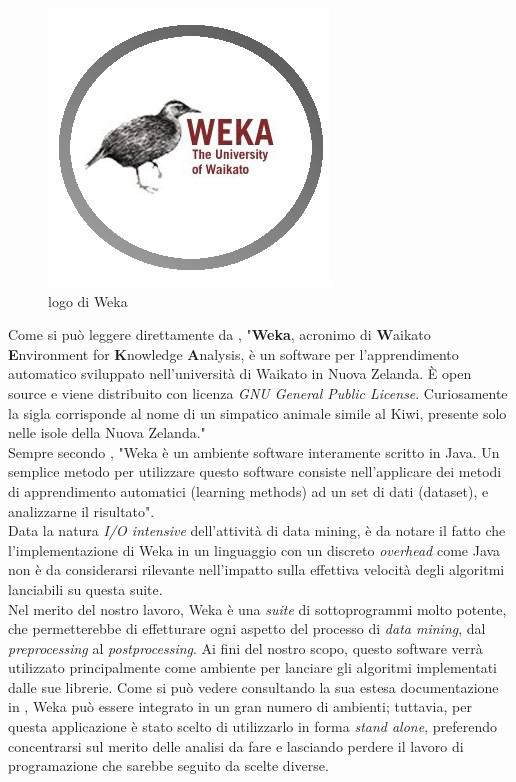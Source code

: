         \begin{figure}
            \centering
            \caption{logo di Weka}
            \label{weka}
    	    \includegraphics[scale=0.65]{img/weka.jpg}
        \end{figure}

    Come si può leggere direttamente da \cite{wekawiki}, "\textbf{Weka}, acronimo di \textbf{W}aikato \textbf{E}nvironment for \textbf{K}nowledge \textbf{A}nalysis, è un software per l'apprendimento automatico sviluppato nell'università di Waikato in Nuova Zelanda. È open source e viene distribuito con licenza \textit{GNU General Public License}. Curiosamente la sigla corrisponde al nome di un simpatico animale simile al Kiwi, presente solo nelle isole della Nuova Zelanda." \\

    Sempre secondo \cite{wekawiki}, "Weka è un ambiente software interamente scritto in Java. Un semplice metodo per utilizzare questo software consiste nell'applicare dei metodi di apprendimento automatici (learning methods) ad un set di dati (dataset), e analizzarne il risultato". \\

    Data la natura \textit{I/O intensive} dell'attività di data mining, è da notare il fatto che l'implementazione di Weka in un linguaggio con un discreto \textit{overhead} come Java non è da considerarsi rilevante nell'impatto sulla effettiva velocità degli algoritmi lanciabili su questa suite.\\

    Nel merito del nostro lavoro, Weka è una \textit{suite} di sottoprogrammi molto potente, che permetterebbe di effetturare ogni aspetto del processo di \textit{data mining}, dal \textit{preprocessing} al \textit{postprocessing}. Ai fini del nostro scopo, questo software verrà utilizzato principalmente come ambiente per lanciare gli algoritmi implementati dalle sue librerie. Come si può vedere consultando la sua estesa documentazione in \cite{weka}, Weka può essere integrato in un gran numero di ambienti; tuttavia, per questa applicazione è stato scelto di utilizzarlo in forma \textit{stand alone}, preferendo concentrarsi sul merito delle analisi da fare e lasciando perdere il lavoro di programazione che sarebbe seguito da scelte diverse.\\

